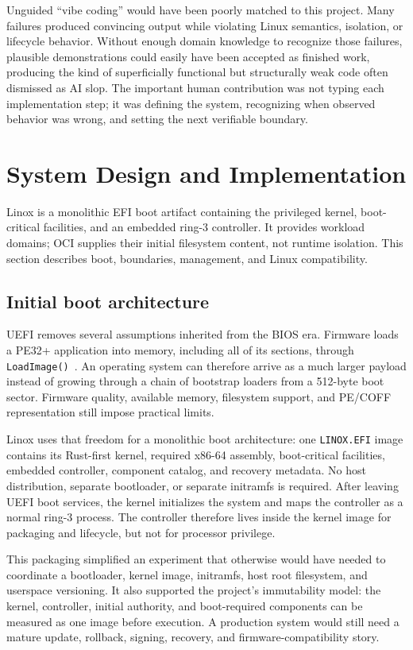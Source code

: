 \documentclass[11pt]{article}
\begin{document}
Unguided ``vibe coding'' would have been poorly matched to this project. Many
failures produced convincing output while violating Linux semantics, isolation,
or lifecycle behavior. Without enough domain knowledge to recognize those
failures, plausible demonstrations could easily have been accepted as finished
work, producing the kind of superficially functional but structurally weak code
often dismissed as AI slop. The important human contribution was not typing
each implementation step; it was defining the system, recognizing when observed
behavior was wrong, and setting the next verifiable boundary.

\section{System Design and Implementation}

Linox is a monolithic EFI boot artifact containing the privileged kernel,
boot-critical facilities, and an embedded ring-3 controller. It provides
workload domains; OCI supplies their initial filesystem content, not runtime
isolation. This section describes boot, boundaries, management, and Linux
compatibility.

\subsection{Initial boot architecture}

UEFI removes several assumptions inherited from the BIOS era. Firmware loads a
PE32+ application into memory, including all of its sections, through
\texttt{LoadImage()}~\cite{uefi211}. An operating system can therefore arrive
as a much larger payload instead of growing through a chain of bootstrap
loaders from a 512-byte boot sector. Firmware quality, available memory,
filesystem support, and PE/COFF representation still impose practical limits.

Linox uses that freedom for a monolithic boot architecture: one
\texttt{LINOX.EFI} image contains its Rust-first kernel, required x86-64
assembly, boot-critical facilities, embedded controller, component catalog,
and recovery metadata. No host distribution, separate bootloader, or separate
initramfs is required. After leaving UEFI boot services, the kernel initializes
the system and maps the controller as a normal ring-3 process. The controller
therefore lives inside the kernel image for packaging and lifecycle, but not
for processor privilege.

This packaging simplified an experiment that otherwise would have needed to
coordinate a bootloader, kernel image, initramfs, host root filesystem, and
userspace versioning. It also supported the project's immutability model: the
kernel, controller, initial authority, and boot-required components can be
measured as one image before execution. A production system would still
need a mature update, rollback, signing, recovery, and firmware-compatibility
story.
\end{document}
